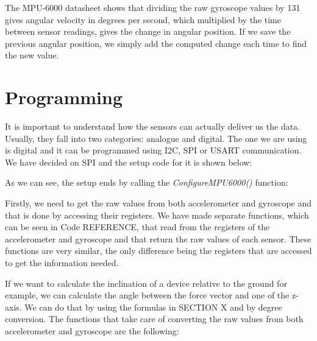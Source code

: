 The MPU-6000 datasheet\cite{MPU6000} shows that dividing the raw gyroscope values by 131 gives angular velocity in degrees per second, which multiplied by the time between sensor readings, gives the change in angular position. If we save the previous angular position, we simply add the computed change each time to find the new value.


\section{Programming}
It is important to understand how the sensors can actually deliver us the data. Usually, they fall into two categories: analogue and digital. The one we are using is digital and it can be programmed using I2C, SPI or USART communication. We have decided on SPI and the setup code for it is shown below:



As we can see, the setup ends by calling the \textit{ConfigureMPU6000()} function:



Firstly, we need to get the raw values from both accelerometer and gyroscope and that is done by accessing their registers. We have made separate functions, which can be seen in Code REFERENCE, that read from the registers of the accelerometer and gyroscope and that return the raw values of each sensor. These functions are very similar, the only difference being the registers that are accessed to get the information needed. 





If we want to calculate the inclination of a device relative to the ground for example, we can calculate the angle between the force vector and one of the z-axis. We can do that by using the formulas in SECTION X and by degree conversion. The functions that take care of converting the raw values from both accelerometer and gyroscope are the following:

